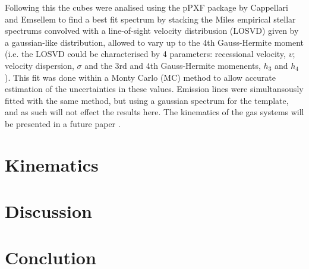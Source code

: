 \documentclass[a4paper,11pt]{article}
\begin{document}
		Following this the cubes were analised using the pPXF package by Cappellari and Emsellem \cite{Cappellari2004} to find a best fit spectrum by stacking the Miles empirical stellar spectrums \cite{Miles} convolved with a line-of-sight velocity distribusion (LOSVD) given by a gaussian-like distribution, allowed to vary up to the 4th Gauss-Hermite moment (i.e. the LOSVD could be characterised by 4 parameters: recessional velocity, $v$; velocity dispersion, $\sigma$ and the 3rd and 4th Gauss-Hermite momenents, $h_3$ and $h_4$). This fit was done within a Monty Carlo (MC) method to allow accurate estimation of the uncertainties in these values. Emission lines were simultansously fitted with the same method, but using a gaussian spectrum for the template, and as such will not effect the results here. The kinematics of the gas systems will be presented in a future paper \cite{warren2017}. 

\section{Kinematics}
	\label{sec:kine}

\section{Discussion}
	\label{sec:discuss}

\section{Conclution}
	\label{sec:conc}





{}
\end{document}
